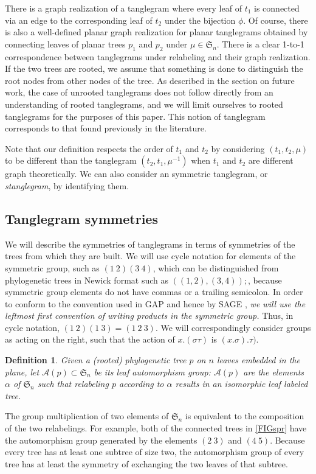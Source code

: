 \documentclass{amsart}
\newtheorem{definition}{Definition}
\newcommand{\fS}{\mathfrak S}
\newcommand{\aut}{\mathcal A}
\newcommand{\pairing}{\mu}
\begin{document}
There is a graph realization of a tanglegram where every leaf of $t_1$ is connected via an edge to the corresponding leaf of $t_2$ under the bijection $\phi$.
Of course, there is also a well-defined planar graph realization for planar tanglegrams obtained by connecting leaves of planar trees $p_1$ and $p_2$ under $\pairing \in \fS_n$.
There is a clear 1-to-1 correspondence between tanglegrams under relabeling and their graph realization.
If the two trees are rooted, we assume that something is done to distinguish the root nodes from other nodes of the tree.
As described in the section on future work, the case of unrooted tanglegrams does not follow directly from an understanding of rooted tanglegrams, and we will limit ourselves to rooted tanglegrams for the purposes of this paper.
This notion of tanglegram corresponds to that found previously in the literature.

Note that our definition respects the order of $t_1$ and $t_2$ by considering $(t_1, t_2, \pairing)$ to be different than the tanglegram $(t_2, t_1, \pairing^{-1})$ when $t_1$ and $t_2$ are different graph theoretically.
We can also consider an symmetric tanglegram, or \emph{stanglegram}, by identifying them.


\subsection{Tanglegram symmetries}
We will describe the symmetries of tanglegrams in terms of symmetries of the trees from which they are built.
We will use cycle notation for elements of the symmetric group, such as $(1\ 2) (3\ 4)$, which can be distinguished from phylogenetic trees in Newick format \cite{wiki:newick} such as $((1,2),(3,4));$, because symmetric group elements do not have commas or a trailing semicolon.
In order to conform to the convention used in GAP \cite{GAP4} and hence by SAGE \cite{SteinJoyner2005}, \emph{we will use the leftmost first convention of writing products in the symmetric group.}
Thus, in cycle notation, $(1\ 2) (1\ 3) = (1\ 2\ 3)$.
We will correspondingly consider groups as acting on the right, such that the action of $x.(\sigma \tau)$ is $(x.\sigma) . \tau)$.

\begin{definition}
Given a (rooted) phylogenetic tree $p$ on $n$ leaves embedded in the plane, let $\aut(p) \subset \fS_n$ be its leaf automorphism group: $\aut(p)$ are the elements $\alpha$ of $\fS_n$ such that relabeling $p$ according to $\alpha$ results in an isomorphic leaf labeled tree.
\end{definition}
The group multiplication of two elements of $\fS_n$ is equivalent to the composition of the two relabelings.
For example, both of the connected trees in \ref{FIGspr} have the automorphism group generated by the elements $(2\ 3)$ and $(4\ 5)$.
Because every tree has at least one subtree of size two, the automorphism group of every tree has at least the symmetry of exchanging the two leaves of that subtree.
\end{document}
